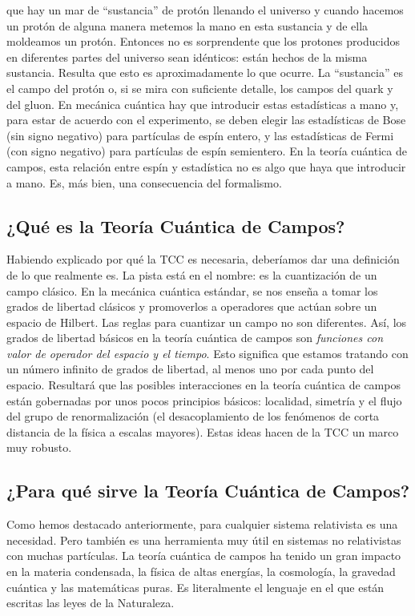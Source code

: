 \documentclass[a4paper,11pt]{book} %
\begin{document}
que hay un mar de ``sustancia'' de protón llenando el universo y cuando hacemos un 
protón de alguna manera metemos la mano en esta sustancia y de ella moldeamos un 
protón. Entonces no es sorprendente que los protones producidos en diferentes partes 
del universo sean idénticos: están hechos de la misma sustancia. Resulta que esto es 
aproximadamente lo que ocurre. La ``sustancia'' es el campo del protón o, si se mira 
con suficiente detalle, los campos del quark y del gluon.
\medskip\newline
En mecánica 
cuántica hay que introducir estas estadísticas a mano y,
para estar de acuerdo con el experimento, se deben elegir las estadísticas de Bose (sin signo negativo) para partículas de espín entero, y las estadísticas de Fermi (con signo negativo) para partículas de espín semientero. En la teoría cuántica de 
campos, esta relación entre espín y estadística no es algo que haya que introducir a 
mano. Es, más bien, una consecuencia del formalismo.
\subsection*{¿Qué es la Teoría Cuántica de Campos?}
\noindent
Habiendo explicado por qué la TCC es necesaria, deberíamos dar una definición de lo que realmente es. 
La pista está en el nombre: es la cuantización de un campo clásico.
\medskip\newline
En la mecánica cuántica estándar, se nos enseña a tomar los grados de libertad clásicos y promoverlos a operadores que 
actúan sobre un espacio de Hilbert. Las reglas para cuantizar un campo no son diferentes. Así, los grados de libertad básicos en la teoría cuántica de campos son \textit{funciones con valor de operador del espacio y el tiempo}. Esto significa que estamos tratando con un número infinito de grados de libertad, al menos uno por cada punto del espacio.
\medskip\newline
Resultará que las posibles interacciones en la teoría cuántica de campos están gobernadas por unos pocos principios básicos: localidad, simetría y el flujo del grupo de renormalización (el desacoplamiento de los fenómenos de corta distancia de la física a escalas mayores). Estas ideas hacen de la TCC un marco muy robusto.

\subsection*{¿Para qué sirve la Teoría Cuántica de Campos?}
\noindent
Como hemos destacado anteriormente, para cualquier sistema relativista es una necesidad. Pero también es una herramienta muy útil en 
sistemas no relativistas con muchas partículas. La teoría cuántica de campos ha tenido un gran impacto en la materia condensada, la física de altas energías, la cosmología, la gravedad cuántica y las matemáticas puras. Es literalmente el lenguaje en el que están escritas las leyes de la Naturaleza.
\newpage
\end{document}

